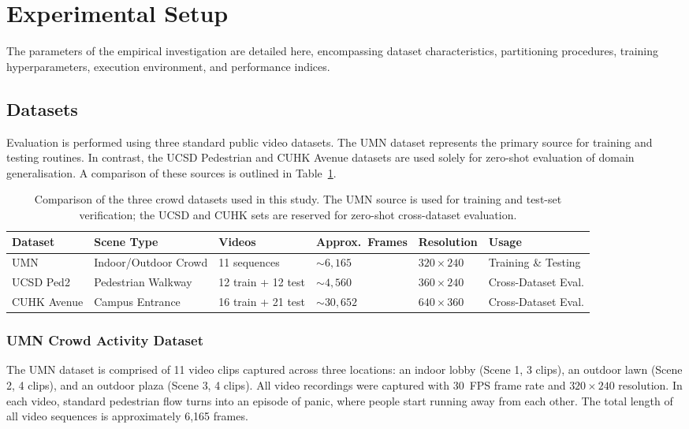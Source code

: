 \section{Experimental Setup}

The parameters of the empirical investigation are detailed here, encompassing dataset characteristics, partitioning procedures, training hyperparameters, execution environment, and performance indices.

\subsection{Datasets}

Evaluation is performed using three standard public video datasets. The UMN dataset represents the primary source for training and testing routines. In contrast, the UCSD Pedestrian and CUHK Avenue datasets are used solely for zero-shot evaluation of domain generalisation. A comparison of these sources is outlined in Table~\ref{tab:datasets}.

\begin{table}[!t]
\centering
\caption{Comparison of the three crowd datasets used in this study. The UMN source is used for training and test-set verification; the UCSD and CUHK sets are reserved for zero-shot cross-dataset evaluation.}
\label{tab:datasets}
\footnotesize
\begin{tabular}{llllll}
\toprule
\textbf{Dataset} & \textbf{Scene Type} & \textbf{Videos} & \textbf{Approx.\ Frames} & \textbf{Resolution} & \textbf{Usage} \\
\midrule
UMN              & Indoor/Outdoor Crowd & 11 sequences  & ${\sim}6{,}165$  & $320 \times 240$ & Training \& Testing \\
UCSD Ped2        & Pedestrian Walkway   & 12 train + 12 test & ${\sim}4{,}560$  & $360 \times 240$ & Cross-Dataset Eval. \\
CUHK Avenue      & Campus Entrance      & 16 train + 21 test & ${\sim}30{,}652$ & $640 \times 360$ & Cross-Dataset Eval. \\
\bottomrule
\end{tabular}
\end{table}

\subsubsection{UMN Crowd Activity Dataset}
The UMN dataset \cite{mehran2009abnormal} is comprised of 11 video clips captured across three locations: an indoor lobby (Scene 1, 3 clips), an outdoor lawn (Scene 2, 4 clips), and an outdoor plaza (Scene 3, 4 clips). All video recordings were captured with 30~FPS frame rate and $320 \times 240$ resolution. In each video, standard pedestrian flow turns into an episode of panic, where people start running away from each other. The total length of all video sequences is approximately 6{,}165 frames.

